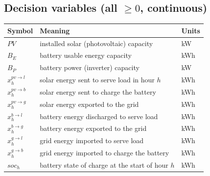 \documentclass[11pt]{article}
\begin{document}
\subsection*{Decision variables (all $\ge 0$, continuous)}
\begin{tabular}{@{}l L{0.62\textwidth} l@{}}
\toprule
Symbol & Meaning & Units \\
\midrule
$PV$ & installed solar (photovoltaic) capacity & kW \\
$B_E$ & battery usable energy capacity & kWh \\
$B_P$ & battery power (inverter) capacity & kW \\
$x_h^{pv\to l}$ & solar energy sent to serve load in hour $h$ & kWh \\
$x_h^{pv\to b}$ & solar energy sent to charge the battery & kWh \\
$x_h^{pv\to g}$ & solar energy exported to the grid & kWh \\
$x_h^{b\to l}$ & battery energy discharged to serve load & kWh \\
$x_h^{b\to g}$ & battery energy exported to the grid & kWh \\
$x_h^{g\to l}$ & grid energy imported to serve load & kWh \\
$x_h^{g\to b}$ & grid energy imported to charge the battery & kWh \\
$soc_h$ & battery state of charge at the start of hour $h$ & kWh \\
\bottomrule
\end{tabular}
\end{document}
